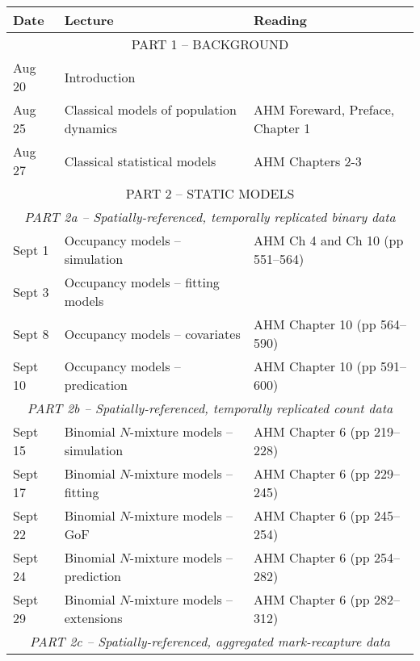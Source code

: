 \documentclass[12pt]{article}
\begin{document}
\begin{center}
\begin{tabular}[c]{lll}
\hline \hline
{\bf Date} & {\bf Lecture}                                & {\bf Reading}                    \\
\hline
           \multicolumn{3}{c}{PART 1 -- BACKGROUND}                                          \\
\hline
Aug 20     & Introduction                                 &                                  \\
\hline
Aug 25     & Classical models of population dynamics      & AHM Foreward, Preface, Chapter 1     \\
Aug 27     & Classical statistical models                 & AHM Chapters 2-3                 \\
\hline
           \multicolumn{3}{c}{PART 2 -- STATIC MODELS}                                      \\
           \multicolumn{3}{c}{\it PART 2a -- Spatially-referenced, temporally replicated binary data}             \\
\hline
Sept 1     & Occupancy models -- simulation               & AHM Ch 4 and Ch 10 (pp 551--564) \\
Sept 3     & Occupancy models -- fitting models           &                                  \\
\hline
Sept 8     & Occupancy models -- covariates               & AHM Chapter 10 (pp 564--590)     \\
Sept 10    & Occupancy models -- predication              & AHM Chapter 10 (pp 591--600)     \\
\hline
           \multicolumn{3}{c}{\it PART 2b -- Spatially-referenced, temporally replicated count data}             \\
\hline
Sept 15    & Binomial $N$-mixture models -- simulation    & AHM Chapter 6 (pp 219--228)      \\
Sept 17    & Binomial $N$-mixture models -- fitting       & AHM Chapter 6 (pp 229--245)      \\
\hline
Sept 22    & Binomial $N$-mixture models -- GoF           & AHM Chapter 6 (pp 245--254)      \\
Sept 24    & Binomial $N$-mixture models -- prediction    & AHM Chapter 6 (pp 254--282)      \\
\hline
Sept 29    & Binomial $N$-mixture models -- extensions    & AHM Chapter 6 (pp 282--312)      \\
\hline
           \multicolumn{3}{c}{\it PART 2c -- Spatially-referenced, aggregated mark-recapture data} \\

\end{tabular}
\end{center}
\end{document}
